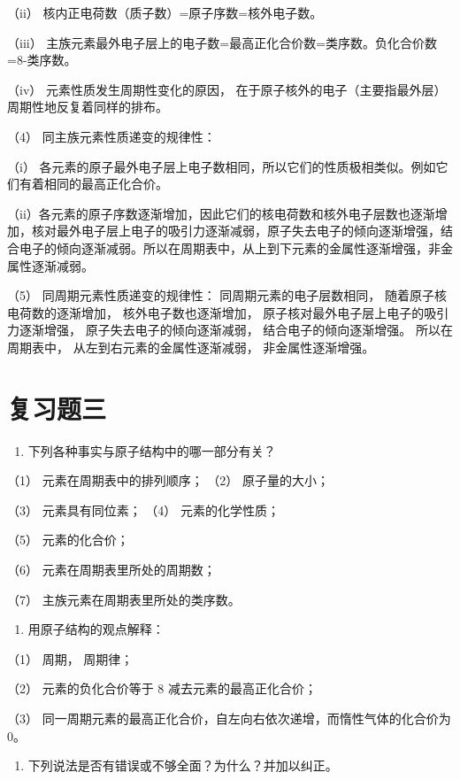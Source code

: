 （ii） 核内正电荷数（质子数）=原子序数=核外电子数。

（iii）
主族元素最外电子层上的电子数=最高正化合价数=类序数。负化合价数=8-类序数。

（iv） 元素性质发生周期性变化的原因，
在于原子核外的电子（主要指最外层）周期性地反复着同样的排布。

（4） 同主族元素性质递变的规律性：

（i）
各元素的原子最外电子层上电子数相同，所以它们的性质极相类似。例如它们有着相同的最高正化合价。

（ii）各元素的原子序数逐渐增加，因此它们的核电荷数和核外电子层数也逐渐增加，核对最外电子层上电子的吸引力逐渐减弱，原子失去电子的倾向逐渐增强，结合电子的倾向逐渐减弱。所以在周期表中，从上到下元素的金属性逐渐增强，非金属性逐渐减弱。

（5） 同周期元素性质递变的规律性： 同周期元素的电子层数相同，
随着原子核电荷数的逐渐增加， 核外电子数也逐渐增加，
原子核对最外电子层上电子的吸引力逐渐增强， 原子失去电子的倾向逐渐减弱，
结合电子的倾向逐渐增强。 所以在周期表中， 从左到右元素的金属性逐渐减弱，
非金属性逐渐增强。

\section{复习题三}

\begin{enumerate}
\item
  下列各种事实与原子结构中的哪一部分有关？
\end{enumerate}

（1） 元素在周期表中的排列顺序； （2） 原子量的大小；

（3） 元素具有同位素； （4） 元素的化学性质；

（5） 元素的化合价；

（6） 元素在周期表里所处的周期数；

（7） 主族元素在周期表里所处的类序数。

\begin{enumerate}[start=2]
\item
  用原子结构的观点解释：
\end{enumerate}

（1） 周期， 周期律；

（2） 元素的负化合价等于 8 减去元素的最高正化合价；

（3）
同一周期元素的最高正化合价，自左向右依次递增，而惰性气体的化合价为0。

\begin{enumerate}[start=3]
\item
  下列说法是否有错误或不够全面？为什么？并加以纠正。
\end{enumerate}

